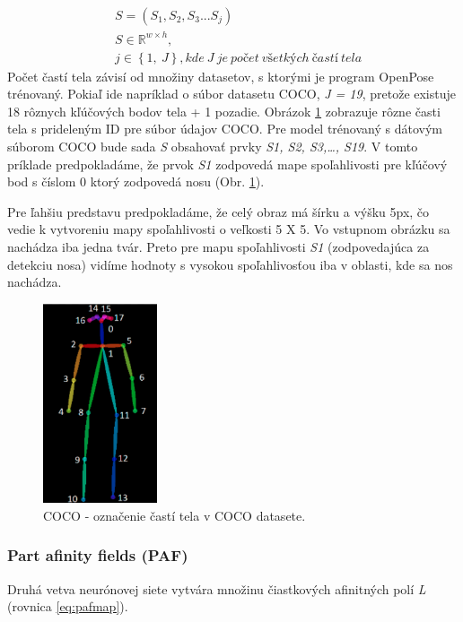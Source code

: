 \documentclass[slovak,master,dept460,male,cpp,cpdeclaration]{diploma}
\begin{document}
\begin{eqnarray}
& S = (S_{1}, S_{2}, S_{3} ... S_{j}) \label{eq:confidencemap}\\
& S\in\mathbb{R}^{w \times  h},\nonumber\\
& j\in \left \{1,\: J  \right \}, kde\: J\: je\: počet\: všetkých\: častí\: tela\nonumber
\end{eqnarray}
Počet častí tela závisí od množiny datasetov, s ktorými je program OpenPose trénovaný. Pokiaľ ide napríklad o súbor datasetu COCO\cite{lin2014microsoft}, \textit{J = 19}, pretože existuje 18 rôznych kľúčových bodov tela + 1 pozadie. Obrázok \ref{fig:cocoDataset} zobrazuje rôzne časti tela s prideleným ID pre súbor údajov COCO. Pre model trénovaný s dátovým súborom COCO bude sada \textit{S} obsahovať prvky \textit{S1, S2, S3,…, S19}. V tomto príklade predpokladáme, že prvok \textit{S1} zodpovedá mape spoľahlivosti pre kľúčový bod s číslom 0 ktorý zodpovedá nosu (Obr. \ref{fig:cocoDataset}).\par Pre ľahšiu predstavu predpokladáme, že celý obraz má šírku a výšku 5px, čo vedie k vytvoreniu  mapy spoľahlivosti o veľkosti 5 X 5. Vo vstupnom obrázku sa nachádza iba jedna tvár. Preto pre mapu spoľahlivosti \textit{S1} (zodpovedajúca za detekciu nosa) vidíme hodnoty s vysokou spoľahlivosťou iba v oblasti, kde sa nos nachádza.\bigskip

\begin{figure}[H]
	\centering
	\includegraphics[width=0.3\textwidth]{Figures/cocoDataset.png}
	\caption{COCO - označenie častí tela v COCO datasete.\cite{cocoDataset}}
	\label{fig:cocoDataset}
\end{figure}


\subsubsection{Part afinity fields (PAF)}
Druhá vetva neurónovej siete vytvára množinu čiastkových afinitných polí \textit{L} (rovnica \ref{eq:pafmap}).
\end{document}
